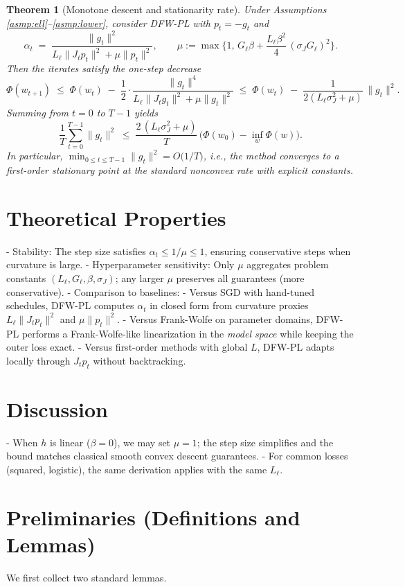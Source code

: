 \documentclass[11pt]{article}
\newtheorem{theorem}{Theorem}
\begin{document}
\begin{theorem}[Monotone descent and stationarity rate]\label{thm:rate}
Under Assumptions \ref{asmp:ell}--\ref{asmp:lower}, consider DFW-PL with $p_t=-g_t$ and
\[
\alpha_t \;=\; \frac{\|g_t\|^2}{L_\ell \|J_t p_t\|^2 + \mu \|p_t\|^2},\qquad \mu := \max\!\Big\{1,\, G_\ell \beta + \frac{L_\ell \beta^2}{4}\,(\sigma_J G_\ell)^2\Big\}.
\]
Then the iterates satisfy the one-step decrease
\[
\Phi(w_{t+1}) \;\le\; \Phi(w_t) \;-\; \frac{1}{2}\cdot \frac{\|g_t\|^4}{L_\ell \|J_t g_t\|^2 + \mu \|g_t\|^2}
\;\le\; \Phi(w_t) \;-\; \frac{1}{2(L_\ell \sigma_J^2+\mu)}\,\|g_t\|^2.
\]
Summing from $t=0$ to $T-1$ yields
\[
\frac{1}{T}\sum_{t=0}^{T-1}\|g_t\|^2 \;\le\; \frac{2\,(L_\ell \sigma_J^2+\mu)}{T}\,\big(\Phi(w_0)-\inf_w \Phi(w)\big).
\]
In particular, $\min_{0\le t\le T-1}\|g_t\|^2 = O\big(1/T\big)$, i.e., the method converges to a first-order stationary point at the standard nonconvex rate with explicit constants.
\end{theorem}

\section*{Theoretical Properties}
- Stability: The step size satisfies $\alpha_t \le 1/\mu \le 1$, ensuring conservative steps when curvature is large.
- Hyperparameter sensitivity: Only $\mu$ aggregates problem constants $(L_\ell,G_\ell,\beta,\sigma_J)$; any larger $\mu$ preserves all guarantees (more conservative).
- Comparison to baselines:
  - Versus SGD with hand-tuned schedules, DFW-PL computes $\alpha_t$ in closed form from curvature proxies $L_\ell\|J_t p_t\|^2$ and $\mu\|p_t\|^2$.
  - Versus Frank-Wolfe on parameter domains, DFW-PL performs a Frank-Wolfe-like linearization in the \emph{model space} while keeping the outer loss exact.
  - Versus first-order methods with global $L$, DFW-PL adapts locally through $J_t p_t$ without backtracking.

\section*{Discussion}
- When $h$ is linear ($\beta=0$), we may set $\mu=1$; the step size simplifies and the bound matches classical smooth convex descent guarantees.
- For common losses (squared, logistic), the same derivation applies with the same $L_\ell$.

\section*{Preliminaries (Definitions and Lemmas)}
We first collect two standard lemmas.
\end{document}
